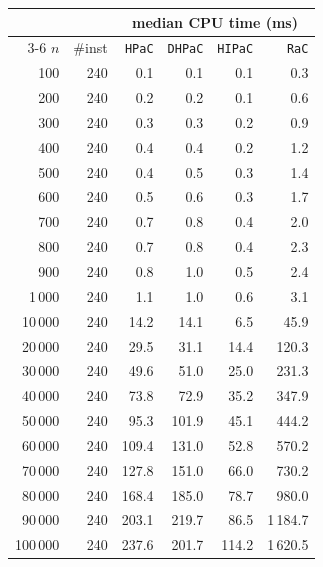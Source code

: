 \begin{tabular}{@{}rrrrrr@{}}
\toprule
 &  & \multicolumn{4}{c}{median CPU time (ms)} \\
\cmidrule(l){3-6}
$n$ & \#inst & \texttt{HPaC} & \texttt{DHPaC} & \texttt{HIPaC} & \texttt{RaC} \\
\midrule
100 & 240 & 0.1 & 0.1 & 0.1 & 0.3 \\
200 & 240 & 0.2 & 0.2 & 0.1 & 0.6 \\
300 & 240 & 0.3 & 0.3 & 0.2 & 0.9 \\
400 & 240 & 0.4 & 0.4 & 0.2 & 1.2 \\
500 & 240 & 0.4 & 0.5 & 0.3 & 1.4 \\
600 & 240 & 0.5 & 0.6 & 0.3 & 1.7 \\
700 & 240 & 0.7 & 0.8 & 0.4 & 2.0 \\
800 & 240 & 0.7 & 0.8 & 0.4 & 2.3 \\
900 & 240 & 0.8 & 1.0 & 0.5 & 2.4 \\
1\,000 & 240 & 1.1 & 1.0 & 0.6 & 3.1 \\
10\,000 & 240 & 14.2 & 14.1 & 6.5 & 45.9 \\
20\,000 & 240 & 29.5 & 31.1 & 14.4 & 120.3 \\
30\,000 & 240 & 49.6 & 51.0 & 25.0 & 231.3 \\
40\,000 & 240 & 73.8 & 72.9 & 35.2 & 347.9 \\
50\,000 & 240 & 95.3 & 101.9 & 45.1 & 444.2 \\
60\,000 & 240 & 109.4 & 131.0 & 52.8 & 570.2 \\
70\,000 & 240 & 127.8 & 151.0 & 66.0 & 730.2 \\
80\,000 & 240 & 168.4 & 185.0 & 78.7 & 980.0 \\
90\,000 & 240 & 203.1 & 219.7 & 86.5 & 1\,184.7 \\
100\,000 & 240 & 237.6 & 201.7 & 114.2 & 1\,620.5 \\
\bottomrule
\end{tabular}
